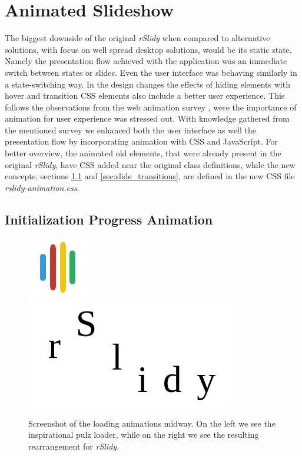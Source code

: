 %
%
% 
% 
% 


\chapter{Animated Slideshow}

\label{chap:animated}

The biggest downside of the original \textit{rSlidy} when compared to alternative solutions, with focus on well spread desktop solutions, would be its static state. Namely the presentation flow achieved with the application was an immediate switch between states or slides. Even the user interface was behaving similarly in a state-switching way. In the design changes the effects of hiding elements with hover and transition CSS elements also include a better user experience. This follows the observations from the web animation survey \citet{WebAnime}, were the importance of animation for user experience was stressed out. With knowledge gathered from the mentioned survey we enhanced both the user interface as well the presentation flow by incorporating animation with CSS and JavaScript. For better overview, the animated old elements, that were already present in the original \textit{rSlidy}, have CSS added near the original class definitions, while the new concepts, sections \ref{sec:initialization} and \ref{sec:slide_transitions}, are defined in the new CSS file \textit{rslidy-animation.css}.

\section{Initialization Progress Animation} %
\label{sec:initialization}

\begin{figure}[tp]
	\centering
	\includegraphics[width = .2\textwidth]{images/pulzLoad.png}
	\includegraphics[width = .4\textwidth]{images/loading.png}	
	\caption[Loader]{
		Screenshot of the loading animations midway. On the left we see the inspirational pulz loader, while on the right we see the resulting rearrangement for \textit{rSlidy}.
	}
	\label{fig:loading}
\end{figure}

